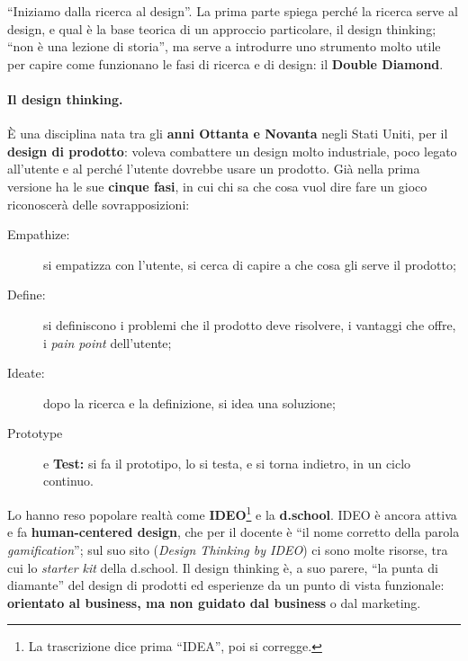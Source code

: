 

``Iniziamo dalla ricerca al design''. La prima parte spiega perché la ricerca serve al
design, e qual è la base teorica di un approccio particolare, il design thinking; ``non
è una lezione di storia'', ma serve a introdurre uno strumento molto utile per capire
come funzionano le fasi di ricerca e di design: il \textbf{Double Diamond}.

\paragraph{Il design thinking.} È una disciplina nata tra gli \textbf{anni Ottanta e
Novanta} negli Stati Uniti, per il \textbf{design di prodotto}: voleva combattere un
design molto industriale, poco legato all'utente e al perché l'utente dovrebbe usare un
prodotto. Già nella prima versione ha le sue \textbf{cinque fasi}, in cui chi sa che
cosa vuol dire fare un gioco riconoscerà delle sovrapposizioni:
\begin{description}
  \item[Empathize:] si empatizza con l'utente, si cerca di capire a che cosa gli serve
        il prodotto;
  \item[Define:] si definiscono i problemi che il prodotto deve risolvere, i vantaggi
        che offre, i \emph{pain point} dell'utente;
  \item[Ideate:] dopo la ricerca e la definizione, si idea una soluzione;
  \item[Prototype] e \textbf{Test:} si fa il prototipo, lo si testa, e si torna
        indietro, in un ciclo continuo.
\end{description}
Lo hanno reso popolare realtà come \textbf{IDEO}\footnote{La trascrizione dice prima
``IDEA'', poi si corregge.} e la \textbf{d.school}. IDEO è ancora attiva e fa
\textbf{human-centered design}, che per il docente è ``il nome corretto della parola
\emph{gamification}''; sul suo sito (\emph{Design Thinking by IDEO}) ci sono molte
risorse, tra cui lo \emph{starter kit} della d.school. Il design thinking è, a suo
parere, ``la punta di diamante'' del design di prodotti ed esperienze da un punto di
vista funzionale: \textbf{orientato al business, ma non guidato dal business} o dal
marketing.

